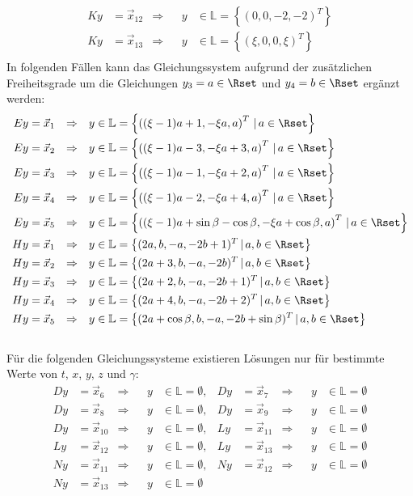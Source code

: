 \documentclass[11pt]{exam}
\begin{document}
\begin{questions}
\begin{solution}
\begin{align*}
		Ky&=\vec{x}_{12}&\Rightarrow&&y&\in\mathbb{L}=\left\{(0,0,-2,-2)^T\right\}\\
		Ky&=\vec{x}_{13}&\Rightarrow&&y&\in\mathbb{L}=\left\{(\xi,0,0,\xi)^T\right\}\\
	\end{align*}
	In folgenden Fällen kann das Gleichungssystem aufgrund der zusätzlichen Freiheitsgrade um die Gleichungen $y_3=a\in\Rset$ und $y_4=b\in\Rset$ ergänzt werden:
	\begin{align*}
		Ey&=\vec{x}_1&\Rightarrow&&y&\in\mathbb{L}=\left\{\left((\xi-1)a+1,-\xi a,a\right)^T\,|\,a\in\Rset\right\}\\
		Ey&=\vec{x}_2&\Rightarrow&&y&\in\mathbb{L}=\left\{\left((\xi-1)a-3,-\xi a+3,a\right)^T\,|\,a\in\Rset\right\}\\
		Ey&=\vec{x}_3&\Rightarrow&&y&\in\mathbb{L}=\left\{\left((\xi-1)a-1,-\xi a+2,a\right)^T\,|\,a\in\Rset\right\}\\
		Ey&=\vec{x}_4&\Rightarrow&&y&\in\mathbb{L}=\left\{\left((\xi-1)a-2,-\xi a+4,a\right)^T\,|\,a\in\Rset\right\}\\
		Ey&=\vec{x}_5&\Rightarrow&&y&\in\mathbb{L}=\left\{\left((\xi-1)a+\sin\beta-\cos\beta,-\xi a+\cos\beta,a\right)^T\,|\,a\in\Rset\right\}\\
		Hy&=\vec{x}_1&\Rightarrow&&y&\in\mathbb{L}=\left\{(2a,b,-a,-2b+1)^T\,|\,a,b\in\Rset\right\}\\
		Hy&=\vec{x}_2&\Rightarrow&&y&\in\mathbb{L}=\left\{(2a+3,b,-a,-2b)^T\,|\,a,b\in\Rset\right\}\\
		Hy&=\vec{x}_3&\Rightarrow&&y&\in\mathbb{L}=\left\{(2a+2,b,-a,-2b+1)^T\,|\,a,b\in\Rset\right\}\\
		Hy&=\vec{x}_4&\Rightarrow&&y&\in\mathbb{L}=\left\{(2a+4,b,-a,-2b+2)^T\,|\,a,b\in\Rset\right\}\\
		Hy&=\vec{x}_5&\Rightarrow&&y&\in\mathbb{L}=\left\{(2a+\cos\beta,b,-a,-2b+\sin\beta)^T\,|\,a,b\in\Rset\right\}\\
	\end{align*}\pagebreak\\
	Für die folgenden Gleichungssysteme existieren Lösungen nur für bestimmte Werte von $t$, $x$, $y$, $z$ und $\gamma$:
	\begin{align*}
		Dy&=\vec{x}_6&\Rightarrow&&y&\in\mathbb{L}=\emptyset,&
		Dy&=\vec{x}_7&\Rightarrow&&y&\in\mathbb{L}=\emptyset\\
		Dy&=\vec{x}_8&\Rightarrow&&y&\in\mathbb{L}=\emptyset,&
		Dy&=\vec{x}_9&\Rightarrow&&y&\in\mathbb{L}=\emptyset\\
		Dy&=\vec{x}_{10}&\Rightarrow&&y&\in\mathbb{L}=\emptyset,&
		Ly&=\vec{x}_{11}&\Rightarrow&&y&\in\mathbb{L}=\emptyset\\
		Ly&=\vec{x}_{12}&\Rightarrow&&y&\in\mathbb{L}=\emptyset,&
		Ly&=\vec{x}_{13}&\Rightarrow&&y&\in\mathbb{L}=\emptyset\\
		Ny&=\vec{x}_{11}&\Rightarrow&&y&\in\mathbb{L}=\emptyset,&
		Ny&=\vec{x}_{12}&\Rightarrow&&y&\in\mathbb{L}=\emptyset\\
		Ny&=\vec{x}_{13}&\Rightarrow&&y&\in\mathbb{L}=\emptyset&
	\end{align*}
\end{solution}

\end{questions}
\end{document}

